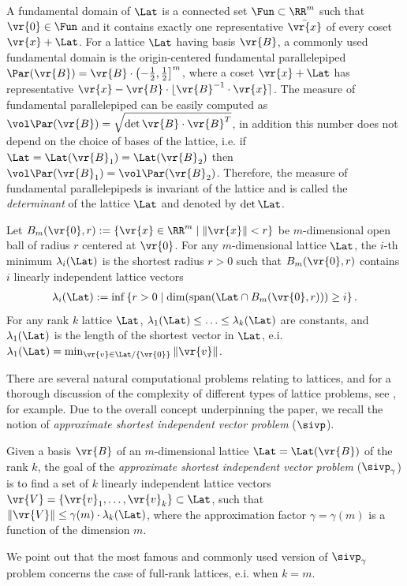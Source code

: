 \documentclass{fundam}
\begin{document}
A fundamental domain of $\Lat$ is a connected set $\Fun\subset \RR^{m}$ such that $\vr{0}\in\Fun$ and it contains exactly one representative $\bar{\vr{x}}$ of every coset $\vr{x}+\Lat$. For a lattice $\Lat$ having basis $\vr{B}$, a commonly used fundamental domain is the origin-centered fundamental parallelepiped $\Par(\vr{B}) = \vr{B}\cdot \left( -\frac{1}{2}, \frac{1}{2}  \right]^{m}$, where a coset $\vr{x}+\Lat$ has representative $\vr{x} - \vr{B}\cdot \lfloor \vr{B}^{-1}\cdot \vr{x}\rceil$. The measure of fundamental parallelepiped  can be easily computed as $\vol \Par(\vr{B}) = \sqrt{\det\vr{B}\cdot \vr{B}^{T}}$, in addition this number does not depend on the choice of bases of the lattice, i.e. if $\Lat = \Lat(\vr{B}_{1}) = \Lat(\vr{B}_{2})$ then $\vol \Par(\vr{B}_{1}) = \vol \Par(\vr{B}_{2})$. Therefore, the measure of fundamental parallelepipeds is invariant of the lattice and is called the \textit{determinant} of the lattice $\Lat$ and denoted by $\det\Lat$.

Let $B_{m}(\vr{0}, r):=\{ \vr{x}\in\RR^{m}\mid \|\vr{x}\|< r \}$ be $m$-dimensional open ball of radius $r$ centered at $\vr{0}$. For any $m$-dimensional lattice $\Lat$, the $i$-th minimum $\lambda_{i}(\Lat)$ is the shortest radius $r>0$ such that $B_{m}(\vr{0},r)$ contains $i$ linearly independent lattice vectors
\begin{align*}
	\lambda_{i}(\Lat):=\inf \left\{  r>0\mid \dim(\text{span}(\Lat \cap B_{m}(\vr{0}, r))) \geq i   \right\}.
\end{align*}
For any rank $k$ lattice $\Lat$, $\lambda_{1}(\Lat)\leq \ldots \leq \lambda_{k}(\Lat)$ are constants, and $\lambda_{1}(\Lat) $ is the length of the shortest vector in $\Lat$, e.i. $\lambda_{1}(\Lat) = \min_{\vr{v}\in \Lat/\{\vr{0}\}}\| \vr{v} \|$.

There are several natural computational problems relating to lattices, and for a thorough discussion of the complexity of different types of lattice problems, see \cite{micciancio2002complexity,peikert2015decade}, for example. Due to the overall concept underpinning the paper, we recall the notion of \textit{approximate shortest independent vector problem }($\sivp$).
\begin{definition}\normalfont
	Given a basis $\vr{B}$ of an $m$-dimensional lattice $\Lat = \Lat (\vr{B})$ of the rank $k$, the goal of the \textit{approximate shortest independent vector problem }($\sivp_{\gamma}$) is to find a set of $k$ linearly independent lattice vectors $\vr{V}=\{ \vr{v}_{1}, \ldots , \vr{v}_{k} \}\subset \Lat$, such that $\| \vr{V} \| \leq \gamma{(m)} \cdot \lambda_{k}(\Lat)$, where the approximation factor $\gamma = \gamma(m)$ is a function of the dimension $m$.
\end{definition}
We point out that the most  famous and commonly used version of $\sivp_{\gamma}$ problem concerns the case of full-rank lattices, e.i. when $k=m$. 
\end{document}
